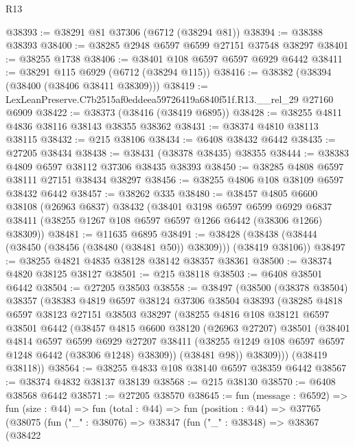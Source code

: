 \begin{lexlean}{R13}
\begin{coremodule}
@38393 := @38291 @81 @37306 (@6712 (@38294 @81))
@38394 := @38388 @38393
@38400 := @38285 @2948 @6597 @6599 @27151 @37548 @38297
@38401 := @38255 @1738
@38406 := @38401 @108 @6597 @6597 @6929 @6442
@38411 := @38291 @115 @6929 (@6712 (@38294 @115))
@38416 := @38382 (@38394 (@38400 (@38406 @38411 @38309)))
@38419 := LexLeanPreserve.C7b2515af0eddeea59726419a6840f51f.R13.__rel_29 @27160 @6909
@38422 := @38373 (@38416 (@38419 @6895))
@38428 := @38255 @4811 @4836 @38116 @38143 @38355 @38362
@38431 := @38374 @4810 @38113 @38115
@38432 := @215 @38106
@38434 := @6408 @38432 @6442
@38435 := @27205 @38434
@38438 := @38431 (@38378 @38435) @38355
@38444 := @38383 @4809 @6597 @38112 @37306 @38435 @38393
@38450 := @38285 @4808 @6597 @38111 @27151 @38434 @38297
@38456 := @38255 @4806 @108 @38109 @6597 @38432 @6442
@38457 := @38262 @335
@38480 := @38457
    @4805
    @6600
    @38108
    (@26963 @6837)
    @38432
    (@38401
      @3198
      @6597
      @6599
      @6929
      @6837
      @38411
      (@38255 @1267 @108 @6597 @6597 @1266 @6442 (@38306 @1266) @38309))
@38481 := @11635 @6895
@38491 := @38428 (@38438 (@38444 (@38450 (@38456 (@38480 (@38481 @50)) @38309))) (@38419 @38106))
@38497 := @38255 @4821 @4835 @38128 @38142 @38357 @38361
@38500 := @38374 @4820 @38125 @38127
@38501 := @215 @38118
@38503 := @6408 @38501 @6442
@38504 := @27205 @38503
@38558 := @38497
    (@38500
      (@38378 @38504)
      @38357
      (@38383
        @4819
        @6597
        @38124
        @37306
        @38504
        @38393
        (@38285
          @4818
          @6597
          @38123
          @27151
          @38503
          @38297
          (@38255
            @4816
            @108
            @38121
            @6597
            @38501
            @6442
            (@38457
              @4815
              @6600
              @38120
              (@26963 @27207)
              @38501
              (@38401
                @4814
                @6597
                @6599
                @6929
                @27207
                @38411
                (@38255 @1249 @108 @6597 @6597 @1248 @6442 (@38306 @1248) @38309))
              (@38481 @98))
            @38309)))
      (@38419 @38118))
@38564 := @38255 @4833 @108 @38140 @6597 @38359 @6442
@38567 := @38374 @4832 @38137 @38139
@38568 := @215 @38130
@38570 := @6408 @38568 @6442
@38571 := @27205 @38570
@38645 := fun (message : @6592) =>
  fun (size : @44) =>
  fun (total : @44) =>
  fun (position : @44) =>
  @37765
    (@38075
      (fun ("_" : @38076) =>
      @38347
        (fun ("_" : @38348) =>
        @38367
          (@38422

\end{coremodule}
\end{lexlean}
